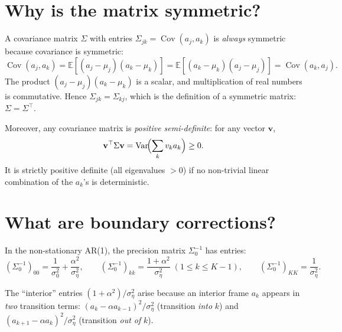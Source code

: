 \documentclass[11pt,a4paper]{article}
\newcommand{\E}{\mathbb{E}}
\newcommand{\Var}{\operatorname{Var}}
\newcommand{\Cov}{\operatorname{Cov}}
\newcommand{\sigeta}{\sigma_\eta^2}
\newcommand{\sigzero}{\sigma_0^2}
\begin{document}
\section{Why is the matrix symmetric?}
\label{sec:q4}

A covariance matrix $\Sigma$ with entries $\Sigma_{jk} = \Cov(a_j, a_k)$ is \emph{always} symmetric because covariance is symmetric:
\begin{equation}
  \Cov(a_j, a_k) = \E[(a_j - \mu_j)(a_k - \mu_k)] = \E[(a_k - \mu_k)(a_j - \mu_j)] = \Cov(a_k, a_j).
\end{equation}
The product $(a_j - \mu_j)(a_k - \mu_k)$ is a scalar, and multiplication of real numbers is commutative.  Hence $\Sigma_{jk} = \Sigma_{kj}$, which is the definition of a symmetric matrix: $\Sigma = \Sigma^\top$.

Moreover, any covariance matrix is \emph{positive semi-definite}: for any vector $\mathbf{v}$,
\begin{equation}
  \mathbf{v}^\top \Sigma \mathbf{v} = \Var\!\Bigl(\sum_k v_k a_k\Bigr) \geq 0.
\end{equation}
It is strictly positive definite (all eigenvalues $> 0$) if no non-trivial linear combination of the $a_k$'s is deterministic.


\section{What are boundary corrections?}
\label{sec:q5}

In the non-stationary AR(1), the precision matrix $\Sigma_0^{-1}$ has entries:
\begin{equation}
  (\Sigma_0^{-1})_{00} = \frac{1}{\sigzero} + \frac{\alpha^2}{\sigeta}, \qquad
  (\Sigma_0^{-1})_{kk} = \frac{1+\alpha^2}{\sigeta}\; (1 \leq k \leq K-1), \qquad
  (\Sigma_0^{-1})_{KK} = \frac{1}{\sigeta}.
\end{equation}

The ``interior'' entries $(1+\alpha^2)/\sigeta$ arise because an interior frame $a_k$ appears in \emph{two} transition terms: $(a_k - \alpha a_{k-1})^2/\sigeta$ (transition \emph{into} $k$) and $(a_{k+1} - \alpha a_k)^2/\sigeta$ (transition \emph{out of} $k$).
\end{document}
